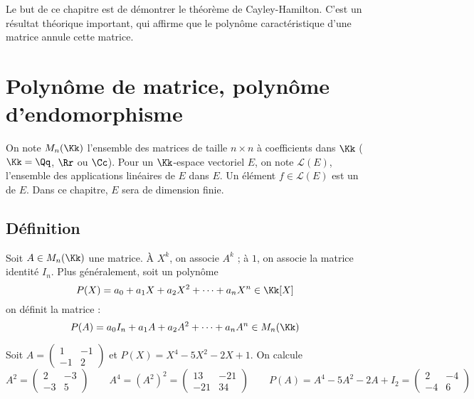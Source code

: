 \documentclass[12pt, class=report,crop=false]{standalone}
\begin{document}

Le but de ce chapitre est de démontrer le théorème de Cayley-Hamilton. 
C'est un résultat théorique important, qui affirme que le polynôme caractéristique d'une matrice annule cette matrice.


\section{Polynôme de matrice, polynôme d'endomorphisme}

On note $M_n(\Kk)$ l'ensemble des matrices de taille $n\times n$ à coefficients dans $\Kk$ 
($\Kk = \Qq$, $\Rr$ ou $\Cc$).
Pour un $\Kk$-espace vectoriel $E$, on note $\mathcal{L}(E)$, l'ensemble des applications linéaires de $E$ dans $E$. Un élément $f \in \mathcal{L}(E)$ est un  de $E$. Dans ce chapitre, $E$ sera de dimension finie.

\subsection{Définition}



Soit $A \in M_n(\Kk)$ une matrice.
\`A $X^k$, on associe $A^k$ ; à $1$, on associe la matrice identité $I_n$.
Plus généralement, soit un polynôme
\[P(X) = a_0 + a_1 X +a_2 X^2 + \cdots  + a_n X^n \in\Kk[X]\]
on définit la matrice :
\[P(A) = a_0 I_n +a_1 A +a_2 A^2 +  \cdots +a_n A^n \in M_n(\Kk) \] 
 
\begin{exemple}
Soit $A = \begin{pmatrix}1&-1\\-1&2\end{pmatrix}$ et $P(X) = X^4-5X^2-2X+1$. 
On calcule 
$$A^2 = \begin{pmatrix}
2 & -3 \\
-3 & 5
\end{pmatrix}
\qquad 
A^4 = (A^2)^2 = \begin{pmatrix}
13 & -21 \\
-21 & 34
\end{pmatrix}
\qquad
P(A) = A^4-5A^2-2A+I_2 = 
\begin{pmatrix}
2 & -4\\
-4 & 6
\end{pmatrix}
$$
\end{exemple}
\end{document}
